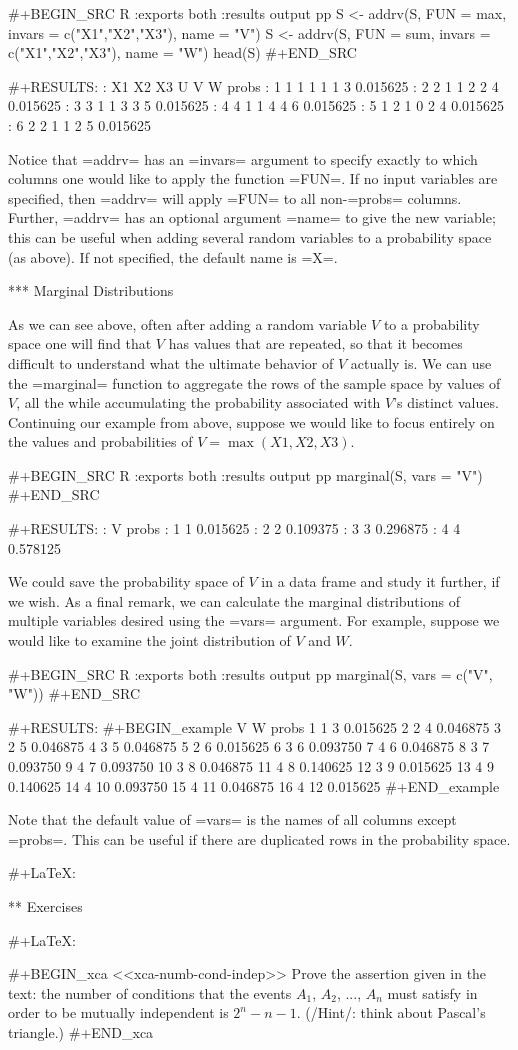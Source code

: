 #+BEGIN_SRC R :exports both :results output pp  
S <- addrv(S, FUN = max, invars = c("X1","X2","X3"), name = "V") 
S <- addrv(S, FUN = sum, invars = c("X1","X2","X3"), name = "W") 
head(S) 
#+END_SRC 

#+RESULTS:
:   X1 X2 X3 U V W    probs
: 1  1  1  1 1 1 3 0.015625
: 2  2  1  1 2 2 4 0.015625
: 3  3  1  1 3 3 5 0.015625
: 4  4  1  1 4 4 6 0.015625
: 5  1  2  1 0 2 4 0.015625
: 6  2  2  1 1 2 5 0.015625

Notice that =addrv= has an =invars= argument to specify exactly to
which columns one would like to apply the function =FUN=. If no input
variables are specified, then =addrv= will apply =FUN= to all
non-=probs= columns. Further, =addrv= has an optional argument =name=
to give the new variable; this can be useful when adding several
random variables to a probability space (as above). If not specified,
the default name is =X=.

*** Marginal Distributions

As we can see above, often after adding a random variable \(V\) to a
probability space one will find that \(V\) has values that are
repeated, so that it becomes difficult to understand what the ultimate
behavior of \(V\) actually is. We can use the =marginal= function to
aggregate the rows of the sample space by values of \(V\), all the
while accumulating the probability associated with \(V\)'s distinct
values. Continuing our example from above, suppose we would like to
focus entirely on the values and probabilities of
\(V=\max(X1,X2,X3)\).

#+BEGIN_SRC R :exports both :results output pp   
marginal(S, vars = "V") 
#+END_SRC

#+RESULTS:
:   V    probs
: 1 1 0.015625
: 2 2 0.109375
: 3 3 0.296875
: 4 4 0.578125

We could save the probability space of \(V\) in a data frame and study
it further, if we wish. As a final remark, we can calculate the
marginal distributions of multiple variables desired using the =vars=
argument. For example, suppose we would like to examine the joint
distribution of \(V\) and \(W\).

#+BEGIN_SRC R :exports both :results output pp   
marginal(S, vars = c("V", "W")) 
#+END_SRC 

#+RESULTS:
#+BEGIN_example
   V  W    probs
1  1  3 0.015625
2  2  4 0.046875
3  2  5 0.046875
4  3  5 0.046875
5  2  6 0.015625
6  3  6 0.093750
7  4  6 0.046875
8  3  7 0.093750
9  4  7 0.093750
10 3  8 0.046875
11 4  8 0.140625
12 3  9 0.015625
13 4  9 0.140625
14 4 10 0.093750
15 4 11 0.046875
16 4 12 0.015625
#+END_example

Note that the default value of =vars= is the names of all columns
except =probs=. This can be useful if there are duplicated rows in the
probability space.

#+LaTeX: \newpage{}

** Exercises

#+LaTeX: \setcounter{thm}{0}

#+BEGIN_xca
<<xca-numb-cond-indep>> Prove the assertion given in the text: the
number of conditions that the events \(A_{1}\), \(A_{2}\), ...,
\(A_{n}\) must satisfy in order to be mutually independent is
\(2^{n} - n - 1\). (/Hint/: think about Pascal's triangle.)
#+END_xca

